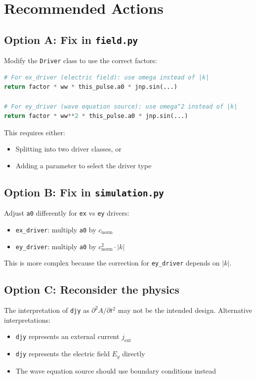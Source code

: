 \documentclass[11pt]{article}
\begin{document}
\newpage
\section{Recommended Actions}

\subsection{Option A: Fix in \texttt{field.py}}
Modify the \texttt{Driver} class to use the correct factors:

\begin{lstlisting}[language=Python]
# For ex_driver (electric field): use omega instead of |k|
return factor * ww * this_pulse.a0 * jnp.sin(...)

# For ey_driver (wave equation source): use omega^2 instead of |k|
return factor * ww**2 * this_pulse.a0 * jnp.sin(...)
\end{lstlisting}

This requires either:
\begin{itemize}
    \item Splitting into two driver classes, or
    \item Adding a parameter to select the driver type
\end{itemize}

\subsection{Option B: Fix in \texttt{simulation.py}}
Adjust \texttt{a0} differently for \texttt{ex} vs \texttt{ey} drivers:
\begin{itemize}
    \item \texttt{ex\_driver}: multiply \texttt{a0} by $c_{\text{norm}}$
    \item \texttt{ey\_driver}: multiply \texttt{a0} by $c_{\text{norm}}^2 \cdot |k|$
\end{itemize}

This is more complex because the correction for \texttt{ey\_driver} depends on $|k|$.

\subsection{Option C: Reconsider the physics}
The interpretation of \texttt{djy} as $\partial^2 A/\partial t^2$ may not be the intended design. Alternative interpretations:
\begin{itemize}
    \item \texttt{djy} represents an external current $j_{\text{ext}}$
    \item \texttt{djy} represents the electric field $E_y$ directly
    \item The wave equation source should use boundary conditions instead
\end{itemize}
\end{document}
